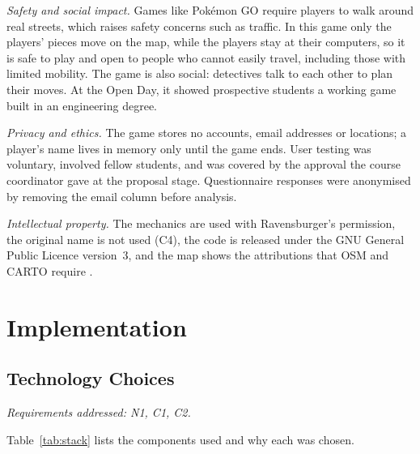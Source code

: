 \documentclass[lettersize,journal]{IEEEtran}
\newcommand{\reqs}[1]{\noindent\textit{Requirements addressed: #1.}\par\smallskip}
\begin{document}
\emph{Safety and social impact.} Games like Pok\'emon GO require players to walk around real streets, which raises safety concerns such as traffic. In this game only the players' pieces move on the map, while the players stay at their computers, so it is safe to play and open to people who cannot easily travel, including those with limited mobility. The game is also social: detectives talk to each other to plan their moves. At the Open Day, it showed prospective students a working game built in an engineering degree.

\emph{Privacy and ethics.} The game stores no accounts, email addresses or locations; a player's name lives in memory only until the game ends. User testing was voluntary, involved fellow students, and was covered by the approval the course coordinator gave at the proposal stage. Questionnaire responses were anonymised by removing the email column before analysis.

\emph{Intellectual property.} The mechanics are used with Ravensburger's permission, the original name is not used (C4), the code is released under the GNU General Public Licence version~3, and the map shows the attributions that OSM and CARTO require \cite{osm}.

\section{Implementation}\label{sec:implementation}

\subsection{Technology Choices}
\reqs{N1, C1, C2}
Table~\ref{tab:stack} lists the components used and why each was chosen.
\end{document}
